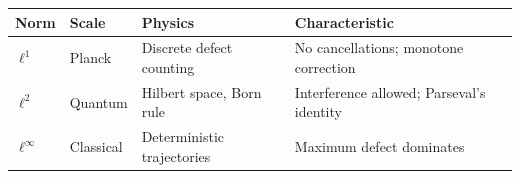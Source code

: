 \documentclass[
]{article}
\begin{document}
\begin{longtable}[]{@{}llll@{}}
\toprule
\begin{minipage}[b]{0.14\columnwidth}\raggedright
Norm\strut
\end{minipage} & \begin{minipage}[b]{0.16\columnwidth}\raggedright
Scale\strut
\end{minipage} & \begin{minipage}[b]{0.21\columnwidth}\raggedright
Physics\strut
\end{minipage} & \begin{minipage}[b]{0.37\columnwidth}\raggedright
Characteristic\strut
\end{minipage}\tabularnewline
\midrule
\endhead
\begin{minipage}[t]{0.14\columnwidth}\raggedright
\(\ell^1\)\strut
\end{minipage} & \begin{minipage}[t]{0.16\columnwidth}\raggedright
Planck\strut
\end{minipage} & \begin{minipage}[t]{0.21\columnwidth}\raggedright
Discrete defect counting\strut
\end{minipage} & \begin{minipage}[t]{0.37\columnwidth}\raggedright
No cancellations; monotone correction\strut
\end{minipage}\tabularnewline
\begin{minipage}[t]{0.14\columnwidth}\raggedright
\(\ell^2\)\strut
\end{minipage} & \begin{minipage}[t]{0.16\columnwidth}\raggedright
Quantum\strut
\end{minipage} & \begin{minipage}[t]{0.21\columnwidth}\raggedright
Hilbert space, Born rule\strut
\end{minipage} & \begin{minipage}[t]{0.37\columnwidth}\raggedright
Interference allowed; Parseval's identity\strut
\end{minipage}\tabularnewline
\begin{minipage}[t]{0.14\columnwidth}\raggedright
\(\ell^\infty\)\strut
\end{minipage} & \begin{minipage}[t]{0.16\columnwidth}\raggedright
Classical\strut
\end{minipage} & \begin{minipage}[t]{0.21\columnwidth}\raggedright
Deterministic trajectories\strut
\end{minipage} & \begin{minipage}[t]{0.37\columnwidth}\raggedright
Maximum defect dominates\strut
\end{minipage}\tabularnewline
\bottomrule
\end{longtable}
\end{document}

